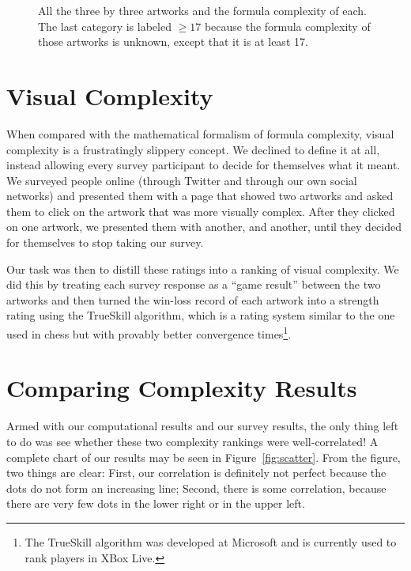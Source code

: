\documentclass[11pt]{article}
\begin{document}
\begin{figure}
\begin{center}
\begin{sideways}

\end{sideways}
\end{center}

\caption{All the three by three artworks and the formula complexity of each.  The last category is labeled $\ge 17$ because the formula complexity of those artworks is unknown, except that it is at least 17.}
\label{fig:allthe3x3}
\end{figure}

\section*{Visual Complexity}

When compared with the mathematical formalism of formula complexity, visual
complexity is a frustratingly slippery concept.  We declined to define it at
all, instead allowing every survey participant to decide for themselves what it
meant.  We surveyed people online (through Twitter and through our own social
networks) and presented them with a page that showed two artworks and asked
them to click on the artwork that was more visually complex.  After they
clicked on one artwork, we presented them with another, and another, until
they decided for themselves to stop taking our survey.

Our task was then to distill these ratings into a ranking of visual complexity.
We did this by treating each survey response as a ``game result'' between the
two artworks and then turned the win-loss record of each artwork into a
strength rating using the TrueSkill algorithm\cite{trueskill}, which is a
rating system similar to the one used in chess but with provably better
convergence times\footnote{The TrueSkill algorithm was developed at Microsoft
and is currently used to rank players in XBox Live.}.

\section*{Comparing Complexity Results}

Armed with our computational results and our survey results, the only thing
left to do was see whether these two complexity rankings were well-correlated!
A complete chart of our results may be seen in Figure~\ref{fig:scatter}.  From
the figure, two things are clear: First, our correlation is definitely not
perfect because the dots do not form an increasing line; Second, there is some
correlation, because there are very few dots in the lower right or in the upper
left.
\end{document}
